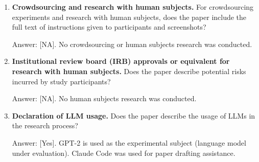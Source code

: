 \documentclass{article}
\begin{document}
\begin{enumerate}
\item \textbf{Crowdsourcing and research with human subjects.} For crowdsourcing experiments and research with human subjects, does the paper include the full text of instructions given to participants and screenshots?

Answer: [NA]. No crowdsourcing or human subjects research was conducted.

\item \textbf{Institutional review board (IRB) approvals or equivalent for research with human subjects.} Does the paper describe potential risks incurred by study participants?

Answer: [NA]. No human subjects research was conducted.

\item \textbf{Declaration of LLM usage.} Does the paper describe the usage of LLMs in the research process?

Answer: [Yes]. GPT-2 is used as the experimental subject (language model under evaluation). Claude Code was used for paper drafting assistance.

\end{enumerate}
\end{document}
